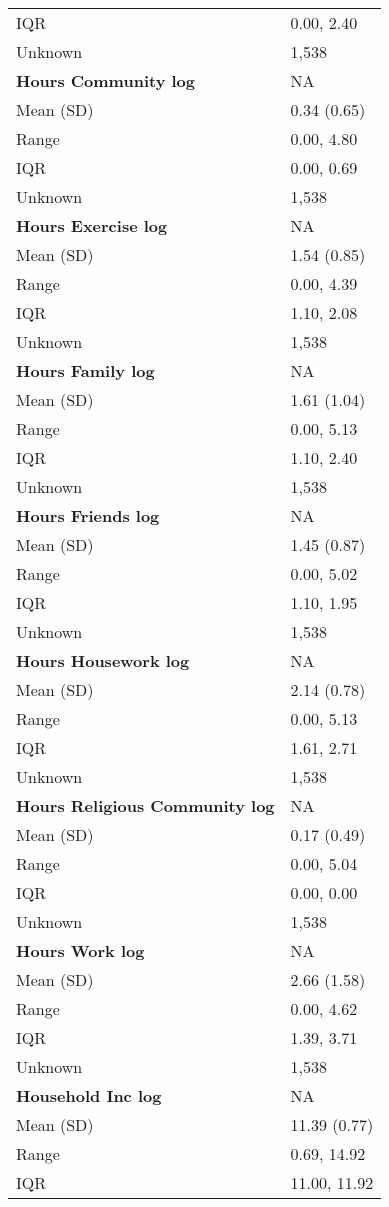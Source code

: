 \documentclass[
  singlecolumn]{article}
\begin{document}
\begin{longtable}[]{@{}ll@{}}
IQR & 0.00, 2.40 \\
Unknown & 1,538 \\
\textbf{Hours Community log} & NA \\
Mean (SD) & 0.34 (0.65) \\
Range & 0.00, 4.80 \\
IQR & 0.00, 0.69 \\
Unknown & 1,538 \\
\textbf{Hours Exercise log} & NA \\
Mean (SD) & 1.54 (0.85) \\
Range & 0.00, 4.39 \\
IQR & 1.10, 2.08 \\
Unknown & 1,538 \\
\textbf{Hours Family log} & NA \\
Mean (SD) & 1.61 (1.04) \\
Range & 0.00, 5.13 \\
IQR & 1.10, 2.40 \\
Unknown & 1,538 \\
\textbf{Hours Friends log} & NA \\
Mean (SD) & 1.45 (0.87) \\
Range & 0.00, 5.02 \\
IQR & 1.10, 1.95 \\
Unknown & 1,538 \\
\textbf{Hours Housework log} & NA \\
Mean (SD) & 2.14 (0.78) \\
Range & 0.00, 5.13 \\
IQR & 1.61, 2.71 \\
Unknown & 1,538 \\
\textbf{Hours Religious Community log} & NA \\
Mean (SD) & 0.17 (0.49) \\
Range & 0.00, 5.04 \\
IQR & 0.00, 0.00 \\
Unknown & 1,538 \\
\textbf{Hours Work log} & NA \\
Mean (SD) & 2.66 (1.58) \\
Range & 0.00, 4.62 \\
IQR & 1.39, 3.71 \\
Unknown & 1,538 \\
\textbf{Household Inc log} & NA \\
Mean (SD) & 11.39 (0.77) \\
Range & 0.69, 14.92 \\
IQR & 11.00, 11.92 \\

\end{longtable}
\end{document}
